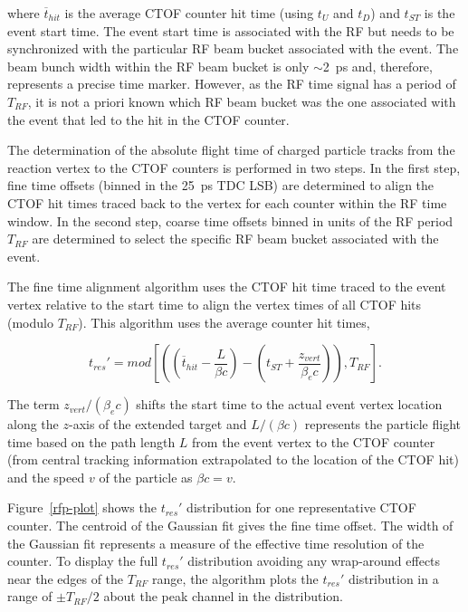 \documentclass{elsart}
\begin{document}
\noindent
where $\overline{t}_{hit}$ is the average CTOF counter hit time (using $t_U$ and $t_D$) and $t_{ST}$
is the event start time. The event start time is associated with the RF but needs to be synchronized
with the particular RF beam bucket associated with the event. The beam bunch width within the RF beam
bucket is only $\sim$2~ps and, therefore, represents a precise time marker. However, as the RF time
signal has a period of $T_{RF}$, it is not a priori known which RF beam bucket was the one associated with
the event that led to the hit in the CTOF counter.

The determination of the absolute flight time of charged particle tracks from the reaction vertex
to the CTOF counters is performed in two steps. In the first step, fine time offsets (binned in the
25~ps TDC LSB) are determined to align the CTOF hit times traced back to the vertex for
each counter within the RF time window. In the second step, coarse time offsets binned in units of the
RF period $T_{RF}$ are determined to select the specific RF beam bucket associated with the event.

The fine time alignment algorithm uses the CTOF hit time traced to the event vertex relative to the
start time to align the vertex times of all CTOF hits (modulo $T_{RF}$). This algorithm uses the average
counter hit times, 

\begin{equation}
t_{res}' = mod \left[ \left( \left(\overline{t}_{hit} - \frac{L}{\beta c} \right) -
\left(t_{ST} + \frac{z_{vert}}{\beta_e c} \right) \right), T_{RF} \right].
\end{equation}

\noindent
The term $z_{vert}/(\beta_e c)$ shifts the start time to the actual event vertex location along the
$z$-axis of the extended target and $L/(\beta c)$ represents the particle flight time based on the
path length $L$ from the event vertex to the CTOF counter (from central tracking information
extrapolated to the location of the CTOF hit) and the speed $v$ of the particle as $\beta c = v$.

Figure~\ref{rfp-plot} shows the $t_{res}'$ distribution for one representative CTOF counter. The
centroid of the Gaussian fit gives the fine time offset. The width of the Gaussian fit represents
a measure of the effective time resolution of the counter. To display the full $t_{res}'$ distribution
avoiding any wrap-around effects near the edges of the $T_{RF}$ range, the algorithm plots the
$t_{res}'$ distribution in a range of $\pm T_{RF}/2$ about the peak channel in the distribution.
\end{document}
